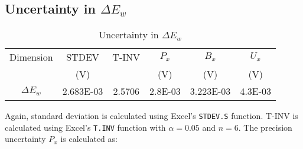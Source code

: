 \section{}

\subsection{Uncertainty in $\Delta E_w$}

\begin{table}[h]
    \centering
    \caption{Uncertainty in $\Delta E_w$}
    \label{tab:Q5UncertaintyDeltaEw}
    \begin{tabular}{cccccc}
        \toprule
        Dimension & STDEV & T-INV & $P_x$ & $B_x$ & $U_x$ \\
        & (V) & & (V) & (V) & (V) \\
        \midrule
        $\Delta E_w$ & 2.683E-03 & 2.5706 & 2.8E-03 & 3.223E-03 & 4.3E-03 \\
        \bottomrule
    \end{tabular}
\end{table}

Again, standard deviation is calculated using Excel's \texttt{STDEV.S} function. T-INV is calculated using Excel's \texttt{T.INV} function with $\alpha = 0.05$ and $n = 6$. 
The precision uncertainty $P_x$ is calculated as:

